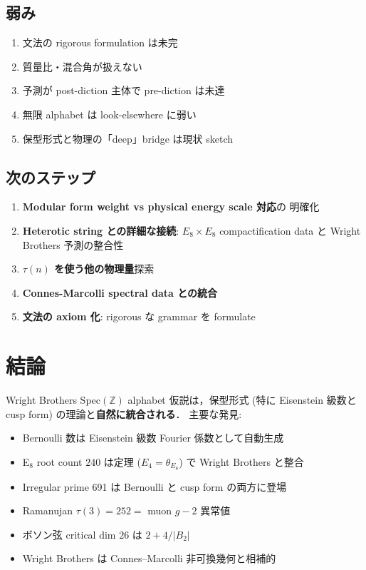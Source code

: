 \documentclass[11pt,a4paper]{article}
\begin{document}
\subsection{弱み}

\begin{enumerate}
\item 文法の rigorous formulation は未完
\item 質量比・混合角が扱えない
\item 予測が post-diction 主体で pre-diction は未達
\item 無限 alphabet は look-elsewhere に弱い
\item 保型形式と物理の「deep」bridge は現状 sketch
\end{enumerate}

\subsection{次のステップ}

\begin{enumerate}
\item \textbf{Modular form weight vs physical energy scale 対応}の
明確化
\item \textbf{Heterotic string との詳細な接続}: $E_8 \times E_8$
compactification data と Wright Brothers 予測の整合性
\item \textbf{$\tau(n)$ を使う他の物理量}探索
\item \textbf{Connes-Marcolli spectral data との統合}
\item \textbf{文法の axiom 化}: rigorous な grammar を formulate
\end{enumerate}

\section{結論}

Wright Brothers Spec$(\mathbb{Z})$ alphabet 仮説は，保型形式 (特に
Eisenstein 級数と cusp form) の理論と\textbf{自然に統合される}．
主要な発見:

\begin{itemize}
\item Bernoulli 数は Eisenstein 級数 Fourier 係数として自動生成
\item E$_8$ root count $240$ は定理 ($E_4 = \theta_{E_8}$) で Wright Brothers と整合
\item Irregular prime 691 は Bernoulli と cusp form の両方に登場
\item Ramanujan $\tau(3) = 252 = $ muon $g-2$ 異常値
\item ボソン弦 critical dim $26$ は $2 + 4/|B_2|$
\item Wright Brothers は Connes--Marcolli 非可換幾何と相補的
\end{itemize}
\end{document}
